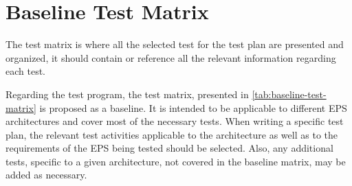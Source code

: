 %
%
%
%
%

%
%
%
%
%

\chapter{Baseline Test Matrix} \label{ch:baseline-matrix}


The test matrix is where all the selected test for the test plan are presented and organized, it should contain or reference all the relevant information regarding each test.

Regarding the test program, the test matrix, presented in \autoref{tab:baseline-test-matrix} is proposed as a baseline.
It is intended to be applicable to different EPS architectures and cover most of the necessary tests.
When writing a specific test plan, the relevant test activities applicable to the architecture as well as to the requirements of the EPS being tested should be selected.
Also, any additional tests, specific to a given architecture, not covered in the baseline matrix, may be added as necessary.


